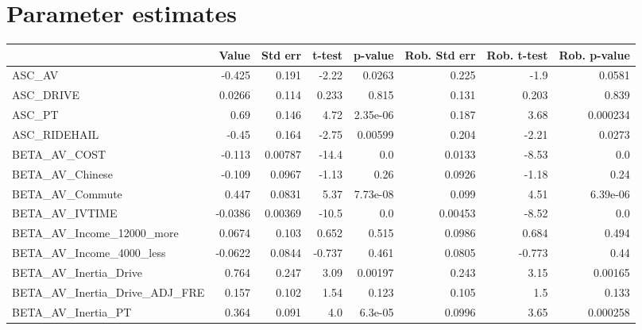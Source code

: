 \section{Parameter estimates}
\begin{tabular}{lrrrrrrr}
\toprule
{} &    Value &  Std err &  t-test &  p-value &  Rob. Std err &  Rob. t-test &  Rob. p-value \\
\midrule
ASC\_AV                           &   -0.425 &    0.191 &   -2.22 &   0.0263 &         0.225 &         -1.9 &        0.0581 \\
ASC\_DRIVE                        &   0.0266 &    0.114 &   0.233 &    0.815 &         0.131 &        0.203 &         0.839 \\
ASC\_PT                           &     0.69 &    0.146 &    4.72 & 2.35e-06 &         0.187 &         3.68 &      0.000234 \\
ASC\_RIDEHAIL                     &    -0.45 &    0.164 &   -2.75 &  0.00599 &         0.204 &        -2.21 &        0.0273 \\
BETA\_AV\_COST                     &   -0.113 &  0.00787 &   -14.4 &      0.0 &        0.0133 &        -8.53 &           0.0 \\
BETA\_AV\_Chinese                  &   -0.109 &   0.0967 &   -1.13 &     0.26 &        0.0926 &        -1.18 &          0.24 \\
BETA\_AV\_Commute                  &    0.447 &   0.0831 &    5.37 & 7.73e-08 &         0.099 &         4.51 &      6.39e-06 \\
BETA\_AV\_IVTIME                   &  -0.0386 &  0.00369 &   -10.5 &      0.0 &       0.00453 &        -8.52 &           0.0 \\
BETA\_AV\_Income\_12000\_more        &   0.0674 &    0.103 &   0.652 &    0.515 &        0.0986 &        0.684 &         0.494 \\
BETA\_AV\_Income\_4000\_less         &  -0.0622 &   0.0844 &  -0.737 &    0.461 &        0.0805 &       -0.773 &          0.44 \\
BETA\_AV\_Inertia\_Drive            &    0.764 &    0.247 &    3.09 &  0.00197 &         0.243 &         3.15 &       0.00165 \\
BETA\_AV\_Inertia\_Drive\_ADJ\_FRE    &    0.157 &    0.102 &    1.54 &    0.123 &         0.105 &          1.5 &         0.133 \\
BETA\_AV\_Inertia\_PT               &    0.364 &    0.091 &     4.0 &  6.3e-05 &        0.0996 &         3.65 &      0.000258 \\

\end{tabular}

